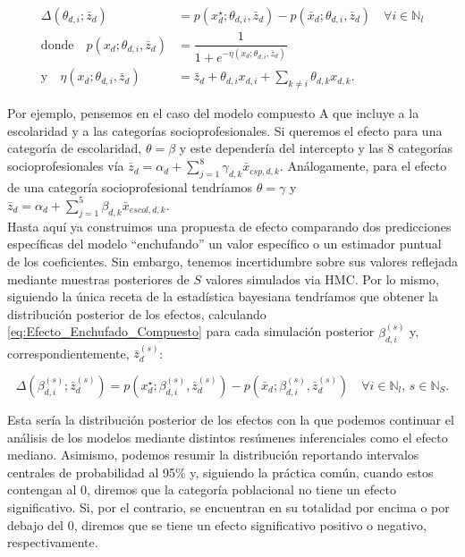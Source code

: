 \begin{align}\label{eq:Efecto_Enchufado_Compuesto}
\Delta(\theta_{d,i};\bar{z}_d) &= p(x_d^\star;\theta_{d,i},\bar{z}_d)-p(\bar{x}_d;\theta_{d,i},\bar{z}_d) \quad \forall i \in \mathbb{N}_l \\
\text{donde} \quad p(x_d;\theta_{d,i},\bar{z}_d) &=\dfrac{1}{1+e^{-\eta(x_d;\theta_{d,i},\bar{z}_d)}} \nonumber \\
\text{y} \quad \eta(x_d;\theta_{d,i},\bar{z}_d) &= \bar{z}_d + \theta_{d,i}x_{d,i} + \sum\limits_{k\neq i} \theta_{d,k}x_{d,k}. \nonumber
\end{align}

Por ejemplo, pensemos en el caso del modelo compuesto A que incluye a la escolaridad y a las categorías socioprofesionales. Si queremos el efecto para una categoría de escolaridad, $\theta = \beta$ y este dependería del intercepto y las 8 categorías socioprofesionales vía $\bar{z}_d = \alpha_d + \sum\limits_{j=1}^8 \gamma_{d,k}\bar{x}_{csp,d,k}$. Análogamente, para el efecto de una categoría socioprofesional tendríamos $\theta = \gamma$ y $\bar{z}_d = \alpha_d + \sum\limits_{j=1}^5 \beta_{d,k}\bar{x}_{escol,d,k}$.\\

Hasta aquí ya construimos una propuesta de efecto comparando dos predicciones específicas del modelo ``enchufando'' un valor específico o un estimador puntual de los coeficientes. Sin embargo, tenemos incertidumbre sobre sus valores reflejada mediante muestras posteriores de $S$ valores simulados via HMC. Por lo mismo, siguiendo la única receta de la estadística bayesiana tendríamos que obtener la distribución posterior de los efectos, calculando \eqref{eq:Efecto_Enchufado_Compuesto} para cada simulación posterior $\beta_{d,i}^{(s)}$ y, correspondientemente, $\bar{z}_d^{(s)}$:

\begin{equation*}
\Delta(\beta_{d,i}^{(s)};\bar{z}_d^{(s)}) =  p(x^\star_{d};\beta_{d,i}^{(s)},\bar{z}_d^{(s)})-p(\bar{x}_{d};\beta_{d,i}^{(s)},\bar{z}_d^{(s)}) \quad \forall i \in \mathbb{N}_l ,\, s \in \mathbb{N}_S.
\end{equation*}

Esta sería la distribución posterior de los efectos con la que podemos continuar el análisis de los modelos mediante distintos resúmenes inferenciales como el efecto mediano. Asimismo, podemos resumir la distribución reportando intervalos centrales de probabilidad al 95\% y, siguiendo la práctica común, cuando estos contengan al 0, diremos que la categoría poblacional no tiene un efecto significativo. Si, por el contrario, se encuentran en su totalidad por encima o por debajo del 0, diremos que se tiene un efecto significativo positivo o negativo, respectivamente.

